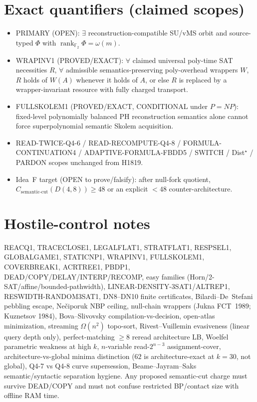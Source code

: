 \documentclass[11pt]{article}
\begin{document}
\section*{Exact quantifiers (claimed scopes)}
\begin{itemize}
\item PRIMARY (OPEN): $\exists$ reconstruction-compatible SU/vMS orbit and source-typed
  $\Phi$ with $\operatorname{rank}_{\mathbb F_2}\Phi=\omega(m)$.
\item WRAPINV1 (PROVED/EXACT): $\forall$ claimed universal poly-time SAT necessities $R$,
  $\forall$ admissible semantics-preserving poly-overhead wrappers $W$, $R$ holds of $W(A)$
  whenever it holds of $A$, or else $R$ is replaced by a wrapper-invariant resource with
  fully charged transport.
\item FULLSKOLEM1 (PROVED/EXACT, CONDITIONAL under $P=NP$): fixed-level polynomially
  balanced PH reconstruction semantics alone cannot force superpolynomial semantic Skolem
  acquisition.
\item READ-TWICE-Q4-6 / READ-RECOMPUTE-Q4-8 / FORMULA-CONTINUATION4 / ADAPTIVE-FORMULA-FBDD5 /
  SWITCH / Dist$^\star$ / PARDON scopes unchanged from H1819.
\item Idea~F target (OPEN to prove/falsify): after null-fork quotient,
  $C_{\mathrm{semantic\textrm{-}cut}}(D(4,8))\ge 48$ or an explicit $<48$ counter-architecture.
\end{itemize}

\section*{Hostile-control notes}
REACQ1, TRACECLOSE1, LEGALFLAT1, STRATFLAT1, RESPSEL1, GLOBALGAME1, STATICNP1, WRAPINV1,
FULLSKOLEM1, COVERBREAK1, ACRTREE1, PBDP1, DEAD/COPY/DELAY/INTERP/RECOMP, easy families
(Horn/2-SAT/affine/bounded-pathwidth), LINEAR-DENSITY-3SAT1/ALTREP1, RESWIDTH-RANDOM3SAT1,
DN8--DN10 finite certificates, Bilardi--De~Stefani pebbling escape, Ne\v{c}iporuk NBP ceiling,
null-chain wrappers (Jukna FCT~1989; Kuznetsov 1984), Bova--Slivovsky compilation-vs-decision,
open-atlas minimization, streaming $\Omega(n^2)$ topo-sort, Rivest--Vuillemin evasiveness
(linear query depth only), perfect-matching $\ge8$ reread architecture LB, Woelfel parametric
weakness at high $k$, $n$-variable read-$2^{n-3}$ assignment-cover, architecture-vs-global
minima distinction ($62$ is architecture-exact at $k=30$, not global), Q4-7 vs Q4-8 curve
supersession, Beame--Jayram--Saks semantic/syntactic separation hygiene.
Any proposed semantic-cut charge must survive DEAD/COPY and must not confuse restricted
BP/contact size with offline RAM time.
\end{document}
